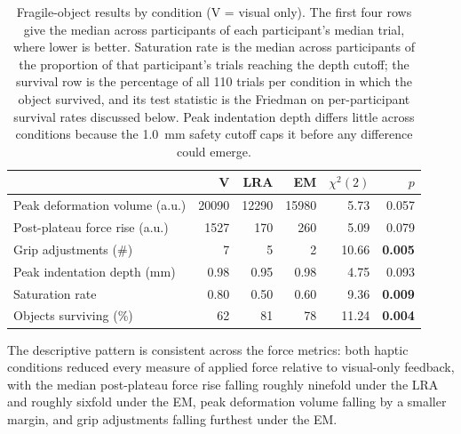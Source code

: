 \documentclass[12pt, a4paper, twoside, openright]{report}
\begin{document}
\begin{table}[ht]
    \centering
    \caption{Fragile-object results by condition (V = visual only). The first
        four rows give the median across participants of each participant's median
        trial, where lower is better. Saturation rate is the median across
        participants of the proportion of that participant's trials reaching the
        depth cutoff; the survival row is the percentage of all 110 trials per
        condition in which the object survived, and its test statistic is the
        Friedman on per-participant survival rates discussed below. Peak
        indentation depth differs little across conditions because the
        \SI{1.0}{\milli\metre} safety cutoff caps it before any difference could
        emerge.}
    \label{tab:quant}
    \begin{tabular}{@{}lrrrrr@{}}
        \toprule
                                       & V     & LRA   & EM    & $\chi^2(2)$ & $p$            \\
        \midrule
        Peak deformation volume (a.u.) & 20090 & 12290 & 15980 & 5.73        & 0.057          \\
        Post-plateau force rise (a.u.) & 1527  & 170   & 260   & 5.09        & 0.079          \\
        Grip adjustments (\#)          & 7     & 5     & 2     & 10.66       & \textbf{0.005} \\
        Peak indentation depth (mm)    & 0.98  & 0.95  & 0.98  & 4.75        & 0.093          \\
        Saturation rate                & 0.80  & 0.50  & 0.60  & 9.36        & \textbf{0.009} \\
        \midrule
        Objects surviving (\%)         & 62    & 81    & 78    & 11.24       & \textbf{0.004} \\
        \bottomrule
    \end{tabular}
\end{table}

The descriptive pattern is consistent across the force metrics: both haptic
conditions reduced every measure of applied force relative to visual-only
feedback, with the median post-plateau force rise falling roughly ninefold
under the LRA and roughly sixfold under the EM, peak deformation volume falling
by a smaller margin, and grip adjustments falling furthest under the EM.
\end{document}
